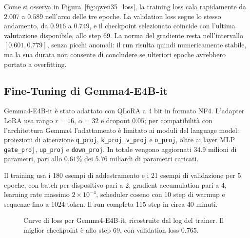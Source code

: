 \documentclass[final,5p,times,twocolumn]{elsarticle}
\begin{document}
Come si osserva in Figura~\ref{fig:qwen35_loss}, la training loss cala rapidamente da $2.007$ a $0.589$ nell'arco delle tre epoche. La validation loss segue lo stesso andamento, da $0.916$ a $0.749$, e il checkpoint selezionato coincide con l'ultima valutazione disponibile, allo step 69. La norma del gradiente resta nell'intervallo $[0.601, 0.779]$, senza picchi anomali: il run risulta quindi numericamente stabile, ma la sua durata non consente di concludere se ulteriori epoche avrebbero portato a overfitting.

\subsection{Fine-Tuning di Gemma4-E4B-it}

Gemma4-E4B-it è stato adattato con QLoRA a 4 bit in formato NF4. L'adapter LoRA usa rango $r=16$, $\alpha=32$ e dropout $0.05$; per compatibilità con l'architettura Gemma4 l'adattamento è limitato ai moduli del language model: proiezioni di attenzione \texttt{q\_proj}, \texttt{k\_proj}, \texttt{v\_proj} e \texttt{o\_proj}, oltre ai layer MLP \texttt{gate\_proj}, \texttt{up\_proj} e \texttt{down\_proj}. In totale vengono aggiornati 34.9 milioni di parametri, pari allo $0.61\%$ dei 5.76 miliardi di parametri caricati.

Il training usa i 180 esempi di addestramento e i 21 esempi di validazione per 5 epoche, con batch per dispositivo pari a 2, gradient accumulation pari a 4, learning rate massimo $2 \times 10^{-4}$, scheduler coseno con 10 step di warmup e sequenze fino a 1024 token. Il run completa 115 step in circa 40 minuti.

\begin{figure}[t]
  \centering
  \caption{Curve di loss per Gemma4-E4B-it, ricostruite dal log del trainer. Il miglior checkpoint è allo step 69, con validation loss $0.765$.}
  \label{fig:gemma4_loss}
\end{figure}
\end{document}
